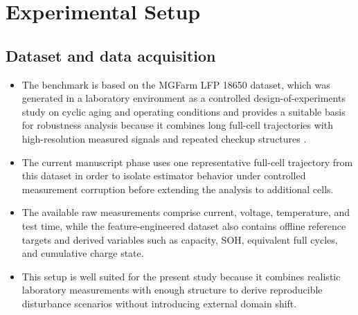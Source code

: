 \documentclass[review]{elsarticle}
\begin{document}
\section{Experimental Setup}
\subsection{Dataset and data acquisition}
\begin{itemize}[leftmargin=*]
    \item The benchmark is based on the MGFarm LFP 18650 dataset, which was generated in a laboratory environment as a controlled design-of-experiments study on cyclic aging and operating conditions and provides a suitable basis for robustness analysis because it combines long full-cell trajectories with high-resolution measured signals and repeated checkup structures \cite{aqachtoulMGFARMIoTEdgeDriven2026,LFP_DoE_Cycle_Aging_Dataset,siebertzStatistischeVersuchsplanung2017}.
    \item The current manuscript phase uses one representative full-cell trajectory from this dataset in order to isolate estimator behavior under controlled measurement corruption before extending the analysis to additional cells.
    \item The available raw measurements comprise current, voltage, temperature, and test time, while the feature-engineered dataset also contains offline reference targets and derived variables such as capacity, SOH, equivalent full cycles, and cumulative charge state.
    \item This setup is well suited for the present study because it combines realistic laboratory measurements with enough structure to derive reproducible disturbance scenarios without introducing external domain shift.
\end{itemize}
\end{document}
